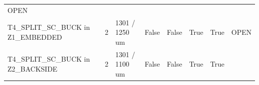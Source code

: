 \documentclass[10pt,]{article}
\begin{document}
\begin{longtable}[]{@{}llllllll@{}}
\begin{minipage}[t]{0.10\columnwidth}
OPEN\strut
\end{minipage}\tabularnewline
\begin{minipage}[t]{0.10\columnwidth}\raggedright
T4\_SPLIT\_SC\_BUCK in Z1\_EMBEDDED\strut
\end{minipage} & \begin{minipage}[t]{0.10\columnwidth}\raggedright
2\strut
\end{minipage} & \begin{minipage}[t]{0.10\columnwidth}\raggedright
1301 / 1250 um\strut
\end{minipage} & \begin{minipage}[t]{0.10\columnwidth}\raggedright
False\strut
\end{minipage} & \begin{minipage}[t]{0.10\columnwidth}\raggedright
False\strut
\end{minipage} & \begin{minipage}[t]{0.10\columnwidth}\raggedright
True\strut
\end{minipage} & \begin{minipage}[t]{0.10\columnwidth}\raggedright
True\strut
\end{minipage} & \begin{minipage}[t]{0.10\columnwidth}\raggedright
OPEN\strut
\end{minipage}\tabularnewline
\begin{minipage}[t]{0.10\columnwidth}\raggedright
T4\_SPLIT\_SC\_BUCK in Z2\_BACKSIDE\strut
\end{minipage} & \begin{minipage}[t]{0.10\columnwidth}\raggedright
2\strut
\end{minipage} & \begin{minipage}[t]{0.10\columnwidth}\raggedright
1301 / 1100 um\strut
\end{minipage} & \begin{minipage}[t]{0.10\columnwidth}\raggedright
False\strut
\end{minipage} & \begin{minipage}[t]{0.10\columnwidth}\raggedright
False\strut
\end{minipage} & \begin{minipage}[t]{0.10\columnwidth}\raggedright
True\strut
\end{minipage} & \begin{minipage}[t]{0.10\columnwidth}\raggedright
True\strut
\end{minipage} & \begin{minipage}[t]{0.10\columnwidth}\raggedright

\end{minipage}
\end{longtable}
\end{document}
